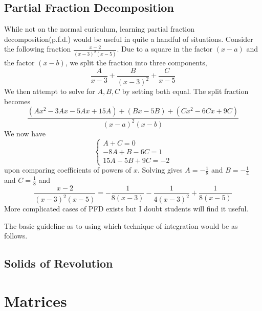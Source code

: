 \documentclass[a4paper]{article}
\begin{document}
\subsection{Partial Fraction Decomposition}
While not on the normal curiculum, learning partial fraction decomposition(p.f.d.) would be useful in quite a handful of situations. Consider the following fraction $\frac{x-2}{(x-3)^2(x-5)}$. Due to a square in the factor $(x-a)$ and the factor $(x-b)$, we split the fraction into three components, $$\frac{A}{x-3}+\frac{B}{(x-3)^2}+\frac{C}{x-5}$$ We then attempt to solve for $A,B,C$ by setting both equal. The split fraction becomes $$\frac{(Ax^2-3Ax-5Ax+15A)+(Bx-5B)+(Cx^2-6Cx+9C)}{(x-a)^2(x-b)}$$ We now have $$\begin{cases}
A+C=0\\
-8A+B-6C=1\\
15A-5B+9C=-2
\end{cases}$$ upon comparing coefficients of powers of $x$. Solving gives $A=-\frac{1}{8}$ and $B=-\frac{1}{4}$ and $C=\frac{1}{8}$ and $$\frac{x-2}{(x-3)^2(x-5)}=-\frac{1}{8(x-3)}-\frac{1}{4(x-3)^2}+\frac{1}{8(x-5)}$$ More complicated cases of PFD exists but I doubt students will find it useful. 

The basic guideline as to using which technique of integration would be as follows. 

\subsection{Solids of Revolution}

\pagebreak
\section{Matrices}
\end{document}
